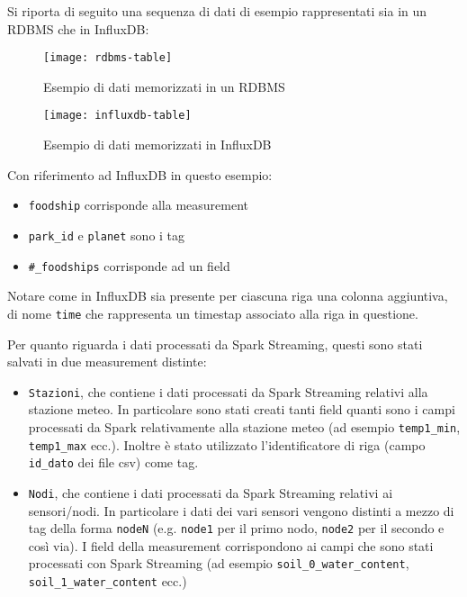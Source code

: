 Si riporta di seguito una sequenza di dati di esempio rappresentati sia in un RDBMS che in InfluxDB:\par

\begin{figure}[ht]
\centering
\texttt{[image: rdbms-table]}
\caption{Esempio di dati memorizzati in un RDBMS}
\label{fig:rdbms-table}
\end{figure}

\begin{figure}[ht]
\centering
\texttt{[image: influxdb-table]}
\caption{Esempio di dati memorizzati in InfluxDB}
\label{fig:influxdb-table}
\end{figure}

\clearpage

Con riferimento ad InfluxDB in questo esempio:

\begin{itemize}
    \item \texttt{foodship} corrisponde alla measurement
    \item \texttt{park\_id} e \texttt{planet} sono i tag
    \item \texttt{\#\_foodships} corrisponde ad un field
\end{itemize}



Notare come in InfluxDB sia presente per ciascuna riga una colonna aggiuntiva, di nome \texttt{time} che rappresenta un timestap associato alla riga in questione.\par

Per quanto riguarda i dati processati da Spark Streaming, questi sono stati salvati in due measurement distinte: \par

\begin{itemize}
    \item \texttt{Stazioni}, che contiene i dati processati da Spark Streaming relativi alla stazione meteo. In particolare sono stati creati tanti field quanti sono i campi processati da Spark relativamente alla stazione meteo (ad esempio \texttt{temp1\_min}, \texttt{temp1\_max} ecc.). Inoltre è stato utilizzato l'identificatore di riga (campo \texttt{id\_dato} dei file csv) come tag.
    \item \texttt{Nodi}, che contiene i dati processati da Spark Streaming relativi ai sensori/nodi. In particolare i dati dei vari sensori vengono distinti a mezzo di tag della forma \texttt{nodeN} (e.g. \texttt{node1} per il primo nodo, \texttt{node2} per il secondo e così via). I field della measurement corrispondono ai campi che sono stati processati con Spark Streaming (ad esempio \texttt{soil\_0\_water\_content}, \texttt{soil\_1\_water\_content} ecc.)
\end{itemize}{}

